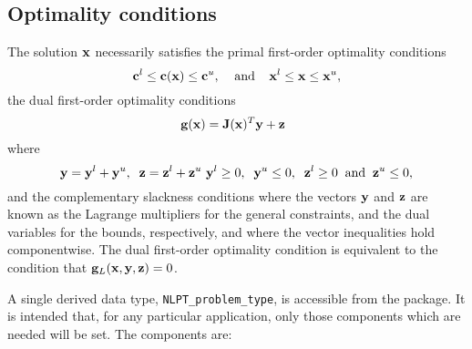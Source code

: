 \documentclass{galahad}
\newcommand{\packagename}{NLPT}
\begin{document}

\subsection{Optimality conditions\label{galopt}}

The solution ${\mathbf{x}}$ necessarily satisfies 
the primal first-order optimality conditions
\[
{\mathbf{c}}^l \leq {\mathbf{c}}({\mathbf{x}}) \leq {\mathbf{c}}^u,
\;\;\;\; \mbox{and} \;\;\;\;
{\mathbf{x}}^l \leq {\mathbf{x}} \leq {\mathbf{x}}^u,
\]
the dual first-order optimality conditions
\[
{\mathbf{g}}( {\mathbf{x}} ) = {\mathbf{J}}({\mathbf{x}})^{T} {\mathbf{y}} + {\mathbf{z}} \;\;
\]
where
\[
{\mathbf{y}} = {\mathbf{y}}^{l} + {\mathbf{y}}^{u}, \;\;
 {\mathbf{z}} = {\mathbf{z}}^{l} + {\mathbf{z}}^{u}\,\,
 {\mathbf{y}}^{l} \geq 0 , \;\;
 {\mathbf{y}}^{u} \leq 0 , \;\;
 {\mathbf{z}}^{l} \geq 0 \;\; \mbox{and} \;\;
 {\mathbf{z}}^{u} \leq 0 ,
\]
and the complementary slackness conditions 
where the vectors ${\mathbf{y}}$ and ${\mathbf{z}}$ are 
known as the Lagrange multipliers for
the general constraints, and the dual variables for the bounds,
respectively, and where the vector inequalities hold componentwise.
The dual first-order optimality condition is equivalent to
the condition that ${\mathbf{g}}_L( {\mathbf{x}},{\mathbf{y}}, {\mathbf{z}}) = 0$.


\galtype
A single derived data type, {\tt \packagename\_problem\_type},
is accessible from the package. It is intended that, for any particular
application, only those components which are needed will be set.
The components are:
\end{document}
